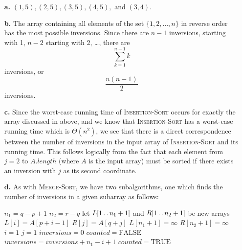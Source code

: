 
\begin{itemize}
    \item[\textbf{a.}]$(1, 5), (2, 5), (3, 5), (4, 5), \text{ and } (3, 4)$.
    \item[\textbf{b.}] The array containing all elements of the set 
        $\lbrace 1, 2, \ldots, n \rbrace$ in reverse order has the most 
        possible inversions. Since there are $n - 1$ inversions, starting with 
        1, $n - 2$ starting with 2, \ldots, there are
        \[
            \sum_{k=1}^{n-1} k
        \]
        inversions, or
        \[
            \frac{n(n - 1)}{2}
        \]
        inversions.
    \item[\textbf{c.}] Since the worst-case running time of \textsc{Insertion-Sort}
        occurs for exactly the array discussed in  above, and we know that
        \textsc{Insertion-Sort} has a worst-case running time which is $\Theta(n^2)$,
        we see that there is a direct correspondence between the number of inversions
        in the input array of \textsc{Insertion-Sort} and its running time. This
        follows logically from the fact that each element from $j = 2$ to 
        $A.\mathit{length}$ (where $A$ is the input array) must be sorted if there
        exists an inversion with $j$ as its second coordinate.
    \item[\textbf{d.}] As with \textsc{Merge-Sort}, we have two subalgorithms, one 
        which finds the number of inversions in a given subarray as follows:
        \begin{algorithmic}[1]
            \STATE $n_1 = q - p + 1$
            \STATE $n_2 = r - q$
            \STATE let $L[1\mathinner{{\ldotp}\,{\ldotp}} n_1 + 1]$ and $R[1\mathinner{{\ldotp}\,{\ldotp}} n_2 + 1]$ be new arrays
                \STATE $L[i] = A[p + i - 1]$
            \ENDFOR
                \STATE $R[j] = A[q + j]$
            \ENDFOR
            \STATE $L[n_1 + 1] = \infty$
            \STATE $R[n_2 + 1] = \infty$
            \STATE $i = 1$
            \STATE $j = 1$
            \STATE $\mathit{inversions} = 0$
            \STATE $\mathit{counted} = \textrm{FALSE}$
                    \STATE $\mathit{inversions} = \mathit{inversions} + n_1 - i + 1$
                    \STATE $\mathit{counted} = \textrm{TRUE}$
                \ENDIF


\end{algorithmic}
\end{itemize}
